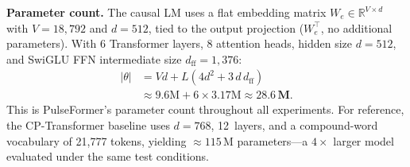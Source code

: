 \documentclass[conference]{IEEEtran}
\begin{document}
\begin{table}[ht]
\centering\small
\caption{Vocabulary sizes for each dimension of the 5D token tuple.
  All values are derived from the training corpus.
  The flat (serialised) vocabulary used by the causal LM head has
  $V=18{,}792$ tokens total.}
\label{tab:vocab}
\end{table}

\textbf{Parameter count.}
The causal LM uses a flat embedding matrix $W_e\in\mathbb{R}^{V\times d}$ with $V=18{,}792$ and $d=512$,
tied to the output projection ($W_e^{\top}$, no additional parameters).
With 6 Transformer layers, 8 attention heads, hidden size $d=512$,
and SwiGLU FFN intermediate size $d_{\mathrm{ff}}=1{,}376$:
\begin{align}\label{eq:params}
  |\theta| &= Vd + L\!\left(4d^2 + 3\,d\,d_{\mathrm{ff}}\right) \nonumber\\
           &\approx 9.6\mathrm{M} + 6{\times}3.17\mathrm{M}
            \approx \mathbf{28.6\,M}.
\end{align}
This is PulseFormer's parameter count throughout all experiments.
For reference, the CP-Transformer baseline uses $d=768$, 12~layers,
and a compound-word vocabulary of 21,777 tokens, yielding $\approx115\,\mathrm{M}$
parameters---a $4\times$ larger model evaluated under the same test conditions.
\end{document}
